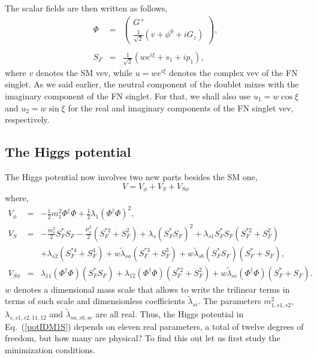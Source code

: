 \documentclass[aps,prd,groupaddress,floatfix,tighten,nofootinbib,showpacs,
amsfonts,superscriptaddress]{revtex4}
\begin{document}
The scalar fields are then written as follows,
%
\begin{subequations}
\begin{eqnarray}
 \Phi& =& \left( \begin{array}{c} G^+ \\ \frac{1}{\sqrt{2}} \left( v + \phi^0 + i G_z \right)
\end{array} \right), \label{dec_doublets} \\ \nonumber \\
 S_F &= &\frac{1}{\sqrt{2}} ( w e^{i\xi}  + s_1 + i p_1 ), \label{dec_singlet}
\end{eqnarray}
\end{subequations}
%
where $v$ denotes the SM vev, while $ u = w e^{i\xi}$  denotes the complex vev of the FN singlet. As we said earlier, the neutral component of the doublet mixes with the imaginary component of the FN singlet. For that,
we shall also use $u_1= w \cos \xi$ and $u_2= w \sin \xi$ for the real and imaginary components of the FN singlet vev, respectively.

\subsection{The Higgs potential\label{subsec:higgspotential}}
The Higgs potential now involves two new parts besides the SM one,
%
\begin{equation}
 V=  V_{\phi}  +  V_S  +  V_{S\phi}
\end{equation}
%
where,
%
\begin{subequations}
\begin{eqnarray}
V_{\phi} &=& -\frac{1}{2}{m_{1}^2} \Phi^\dagger \Phi  
+ \frac{1}{2}\lambda_1 \left( \Phi^\dagger \Phi \right)^2,\\
V_S &=& -\frac{m^2_{s}}{2} S^*_F S_F -\frac{\mu^2_{s}}{2} (S^{*2}_F + S^2_F) + \lambda_{s} (S^*_F S_F)^2
      + \lambda_{s1} S^*_F S_F (S^{*2}_F + S^2_F)   \\
    & &  + \lambda_{s2} (S^{*4}_F + S^4_F) + w \tilde{\lambda}_{sa} (S^{*3}_F + S^3_F) + w \tilde{\lambda}_{sb} (S^*_F S_F) (S^{*}_F + S_F),
 \nonumber\\
V_{S\phi} &=& \lambda_{11} (\Phi^\dagger\Phi)(S^*_F S_F) + {\lambda}_{12} (\Phi^\dagger\Phi) (S^{*2}_F + S^2_F)
                 + w \tilde{\lambda}_{sc} (\Phi^\dagger\Phi) (S^{*}_F + S_F).
                 \end{eqnarray}
\label{potIDM1S}
\end{subequations}
%
$w$ denotes a dimensional mass scale that allows to write the trilinear terms in terms of such scale
and dimensionless coefficients $\tilde{\lambda}_{si}$. The parameters $m_{1, s1, s2}^2$, $\lambda_{s, s1, s2, 11,12}$ and $\tilde{\lambda}_{sa, sb, sc}$ are all real. Thus, the Higgs potential in Eq.~(\ref{potIDM1S}) depends on eleven real parameters, a total of twelve  degrees of freedom, but how many are physical? To find this out let us first study the minimization conditions.
\end{document}
